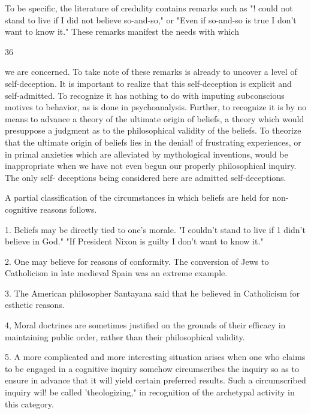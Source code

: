 \documentclass[10pt,twoside]{memoir}
\begin{document}
\begin{enumerate}
{{{{{To be specific, the literature of credulity contains remarks such as "! 
could not stand to live if I did not believe so-and-so," or "Even if so-and-so is 
true I don't want to know it." These remarks manifest the needs with which 


36 


we are concerned. To take note of these remarks is already to uncover a level 
of self-deception. It is important to realize that this self-deception is explicit 
and self-admitted. To recognize it has nothing to do with imputing 
subconscious motives to behavior, as is done in psychoanalysis. Further, to 
recognize it is by no means to advance a theory of the ultimate origin of 
beliefs, a theory which would presuppose a judgment as to the philosophical 
validity of the beliefs. To theorize that the ultimate origin of beliefs lies in 
the denial! of frustrating experiences, or in primal anxieties which are 
alleviated by mythological inventions, would be inappropriate when we have 
not even begun our properly philosophical inquiry. The only self- deceptions 
being considered here are admitted self-deceptions. 

A partial classification of the circumstances in which beliefs are held for 
non-cognitive reasons follows. 

1. Beliefs may be directly tied to one's morale. "I couldn't stand to 
live if 1 didn't believe in God." "If President Nixon is guilty I don't want to 
know it." 

2. One may believe for reasons of conformity. The conversion of Jews 
to Catholicism in late medieval Spain was an extreme example. 

3. The American philosopher Santayana said that he believed in 
Catholicism for esthetic reasons. 

4, Moral doctrines are sometimes justified on the grounds of their 
efficacy in maintaining public order, rather than their philosophical validity. 

5. A more complicated and more interesting situation arises when one 
who claims to be engaged in a cognitive inquiry somehow circumscribes the 
inquiry so as to ensure in advance that it will yield certain preferred results. 
Such a circumscribed inquiry wil! be called 'theologizing," in recognition of 
the archetypal activity in this category. 

}}}}}
\end{enumerate}
\end{document}
